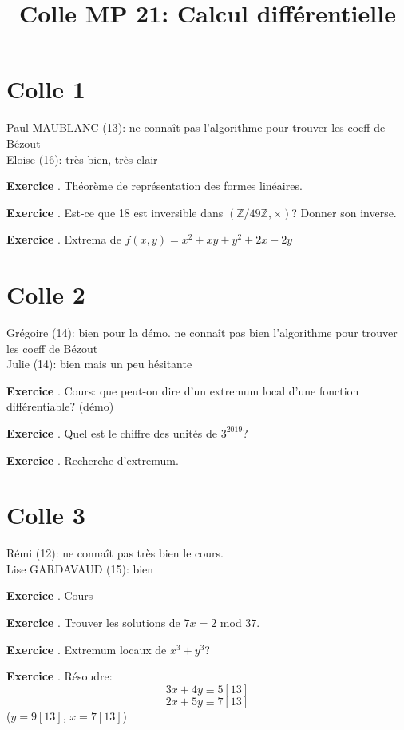 \documentclass[10pt,a4paper]{article}
\title{Colle MP 21: Calcul différentielle}
\newcounter{question}
\newcounter{exo}
\newenvironment{exo}{\vspace{0.5cm}\setcounter{question}{0}\addtocounter{exo}{1} \noindent \textbf{Exercice \theexo}. \normalsize }{\par}
\begin{document}
	\maketitle
	
	\section*{Colle 1}	
	Paul MAUBLANC (13): ne connaît pas l'algorithme pour trouver les coeff de Bézout\\
	Eloise (16): très bien, très clair\\
	
	\begin{exo}
		Théorème de représentation des formes linéaires.
	\end{exo}

	\begin{exo}
		Est-ce que 18 est inversible dans $(\mathbb{Z}/ 49\mathbb{Z}, \times)$? Donner son inverse.
	\end{exo}
	
	\begin{exo}
		Extrema de $f(x, y) = x^2 + xy + y^2 + 2x - 2y$
	\end{exo}	
			
	\section*{Colle 2}
	\setcounter{exo}{0}
	Grégoire (14): bien pour la démo. ne connaît pas bien l'algorithme pour trouver les coeff de Bézout\\
	Julie (14): bien mais un peu hésitante\\
	
	\begin{exo}
		Cours: que peut-on dire d'un extremum local d'une fonction différentiable? (démo)
	\end{exo}
	\begin{exo}
		Quel est le chiffre des unités de $3^{2019}$?
	\end{exo}
	
	
	\begin{exo}
		Recherche d'extremum.
	\end{exo}	
	
	\section*{Colle 3}
	\setcounter{exo}{0}
	Rémi (12): ne connaît pas très bien le cours.\\
	Lise GARDAVAUD (15): bien\\
	
	\begin{exo}
		Cours
	\end{exo}

	\begin{exo}
		Trouver les solutions de $7x = 2$ mod $37$.
	\end{exo}	

	\begin{exo}
		Extremum locaux de $x^3 + y^3$?
	\end{exo}	
	
	\begin{exo}
		Résoudre:
		$$3x+4y \equiv 5 [13]$$
		$$2x+5y \equiv 7 [13]$$
		($y=9 [13]$, $x=7 [13]$)
	\end{exo}	
\end{document}
